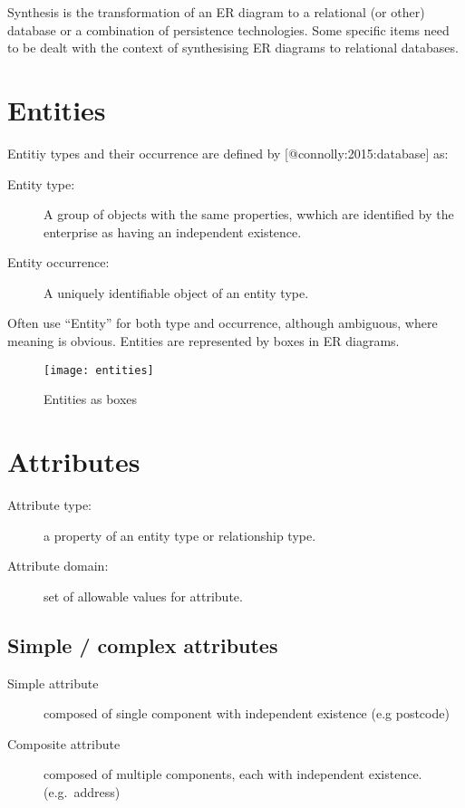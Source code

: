 Synthesis is the transformation of an ER diagram to a relational (or
other) database or a combination of persistence technologies. Some
specific items need to be dealt with the context of synthesising ER
diagrams to relational databases.

\section{Entities}\label{entities}

Entitiy types and their occurrence are defined by
{[}@connolly:2015:database{]} as:

\begin{description}
\item[Entity type:]
A group of objects with the same properties, wwhich are identified by
the enterprise as having an independent existence.
\item[Entity occurrence:]
A uniquely identifiable object of an entity type.
\end{description}

Often use ``Entity'' for both type and occurrence, although ambiguous,
where meaning is obvious. Entities are represented by boxes in ER
diagrams.

\begin{figure}[htbp]
\centering
\texttt{[image: entities]}
\caption{Entities as boxes{}}
\end{figure}

\section{Attributes}\label{attributes}

\begin{description}
\item[Attribute type:]
a property of an entity type or relationship type.
\item[Attribute domain:]
set of allowable values for attribute.
\end{description}

\subsection{Simple / complex attributes}\label{simple-complex-attributes}

\begin{description}
\item[Simple attribute]
composed of single component with independent existence (e.g postcode)
\item[Composite attribute]
composed of multiple components, each with independent existence.
(e.g.~address)
\end{description}

